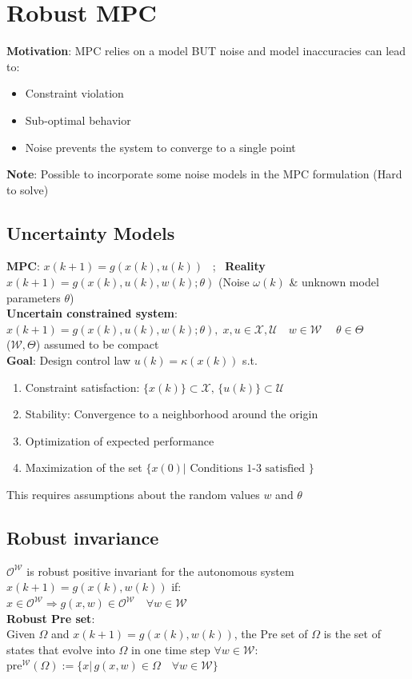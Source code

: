 \section{Robust MPC}
\vspace{0.5em}
\textbf{Motivation}: MPC relies on a model BUT noise and model inaccuracies can lead to:
\begin{itemize}
    \item Constraint violation
    \item Sub-optimal behavior
    \item Noise prevents the system to converge to a single point\\
\end{itemize}
\textbf{Note}: Possible to incorporate some noise models in the MPC formulation (Hard to solve)\\


\subsection{Uncertainty Models}
\textbf{MPC}: $x(k+1)=g(x(k),u(k))$ \, ; \, \textbf{Reality} $x(k+1)=g(x(k),u(k),w(k);\theta)$ (Noise $\omega(k)$ \& unknown model parameters $\theta$)\\
\textbf{Uncertain constrained system}:\\
$x(k+1)=g(x(k),u(k),w(k);\theta),\;x,u\in\mathcal{X,\mathcal{U}}\quad w\in\mathcal{W}\;\quad \theta\in\Theta$\\
($\mathcal{W},\Theta$) assumed to be compact\\
\textbf{Goal}: Design control law $u(k)=\kappa(x(k))$ s.t.
\begin{enumerate}
    \item Constraint satisfaction: $\{x(k)\}\subset\mathcal{X},\,\{u(k)\}\subset \mathcal{U}$
    \item Stability: Convergence to a neighborhood around the origin
    \item Optimization of expected performance
    \item Maximization of the set $\{x(0)|\text{ Conditions 1-3 satisfied }\}$
\end{enumerate}
\rightarrow This requires assumptions about the random values $w$ and $\theta$

\subsection{Robust invariance}
$\mathcal{O^W}$ is robust positive invariant for the autonomous system $x(k+1)=g(x(k),w(k))$ if:\\
$x\in\mathcal{O^W}\Rightarrow g(x,w)\in\mathcal{O^W}\quad\forall w\in \mathcal{W}$\\
\textbf{Robust Pre set}:\\
Given $\Omega$ and $x(k+1)=g(x(k),w(k))$, the Pre set of $\Omega$ is the set of states that evolve into $\Omega$ in one time step $ \forall w\in\mathcal{W}$:
$\text{pre}^\mathcal{W}(\Omega):=\{x|\,g(x,w)\in\Omega\quad \forall w\in\mathcal{W}\}$\\
